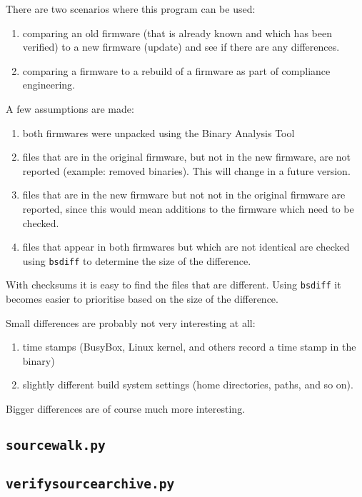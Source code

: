 \documentclass[10pt]{article}
\begin{document}
There are two scenarios where this program can be used:

\begin{enumerate}
\item comparing an old firmware (that is already known and which has been
verified) to a new firmware (update) and see if there are any differences.
\item comparing a firmware to a rebuild of a firmware as part of compliance
engineering.
\end{enumerate}

A few assumptions are made:

\begin{enumerate}
\item both firmwares were unpacked using the Binary Analysis Tool
\item files that are in the original firmware, but not in the new firmware, are
not reported (example: removed binaries). This will change in a future version.
\item files that are in the new firmware but not not in the original firmware are
reported, since this would mean additions to the firmware which need to be
checked.
\item files that appear in both firmwares but which are not identical are
checked using \texttt{bsdiff} to determine the size of the difference.
\end{enumerate}

With checksums it is easy to find the files that are different. Using
\texttt{bsdiff} it becomes easier to prioritise based on the size of the
difference.

Small differences are probably not very interesting at all:

\begin{enumerate}
\item time stamps (BusyBox, Linux kernel, and others record a time stamp in the
binary)
\item slightly different build system settings (home directories, paths, and
so on).
\end{enumerate}

Bigger differences are of course much more interesting.

\subsection{\texttt{sourcewalk.py}}

\subsection{\texttt{verifysourcearchive.py}}
\end{document}
